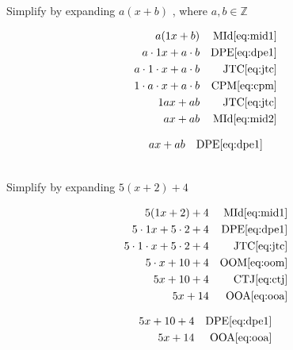 \documentclass[20150903-160354-rs2.2-MarksMathNotebook.tex]{subfiles}
\begin{document}
\begin{example}[id:20141109-092910] \label{20141109-092910}  \hfill \\

Simplify by expanding $a(x+b)$ , where $a, b \in \mathbb{Z}$

\soln

\solnsteps
\begin{align*}
a(1x+b)  && \text{MId} \eqref{eq:mid1} \\
a \cdot 1x + a \cdot b  && \text{DPE} \eqref{eq:dpe1} \\
a \cdot 1 \cdot x + a \cdot b  && \text{JTC} \eqref{eq:jtc} \\
1 \cdot a \cdot x + a \cdot b  && \text{CPM} \eqref{eq:cpm} \\
1ax + ab  && \text{JTC} \eqref{eq:jtc} \\
ax+ab  && \text{MId} \eqref{eq:mid2}
\end{align*}

\soln

\lesssteps
\begin{align*}
ax +ab && \text{DPE} \eqref{eq:dpe1}
\end{align*}
\end{example}

\begin{example}[id:20141109-093220] \label{20141109-093220}  \hfill \\

Simplify by expanding $5(x+2)+4$

\soln

\solnsteps
\begin{align*}
5(1x+2)+4 && \text{MId} \eqref{eq:mid1} \\
5 \cdot 1x + 5 \cdot 2 + 4 && \text{DPE} \eqref{eq:dpe1} \\
5 \cdot 1 \cdot x + 5 \cdot 2 + 4 && \text{JTC} \eqref{eq:jtc} \\
5 \cdot x +10+4 && \text{OOM} \eqref{eq:oom} \\
5x+10+4 && \text{CTJ} \eqref{eq:ctj} \\
5x+14 && \text{OOA} \eqref{eq:ooa} \\
\end{align*}

\soln

\lesssteps
\begin{align*}
5x + 10 + 4 && \text{DPE} \eqref{eq:dpe1} \\
5x + 14 && \text{OOA} \eqref{eq:ooa}
\end{align*}
\end{example}
\end{document}

